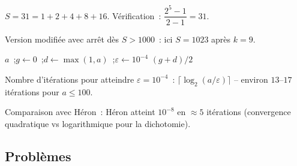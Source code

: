 $S=31=1+2+4+8+16$. V\'erification~: $\dfrac{2^5-1}{2-1}=31$.\checkmark

Version modifi\'ee avec arr\^et d\`es $S>1000$~: ici $S=1023$ apr\`es $k=9$.


\begin{algorithm}[H]
\caption{$\sqrt{a}$ par dichotomie}
\Lire $a$~;\quad $g\leftarrow0$~;\quad $d\leftarrow\max(1,a)$~;\quad $\varepsilon\leftarrow10^{-4}$\;
\Afficher $(g+d)/2$\;
\end{algorithm}

Nombre d'it\'erations pour atteindre $\varepsilon=10^{-4}$~:
$\lceil\log_2(a/\varepsilon)\rceil$ -- environ $13$--$17$ it\'erations pour $a\leq100$.

Comparaison avec H\'eron~: H\'eron atteint $10^{-8}$ en $\approx5$ it\'erations
(convergence quadratique vs logarithmique pour la dichotomie).

\subsection*{Probl\`emes}


